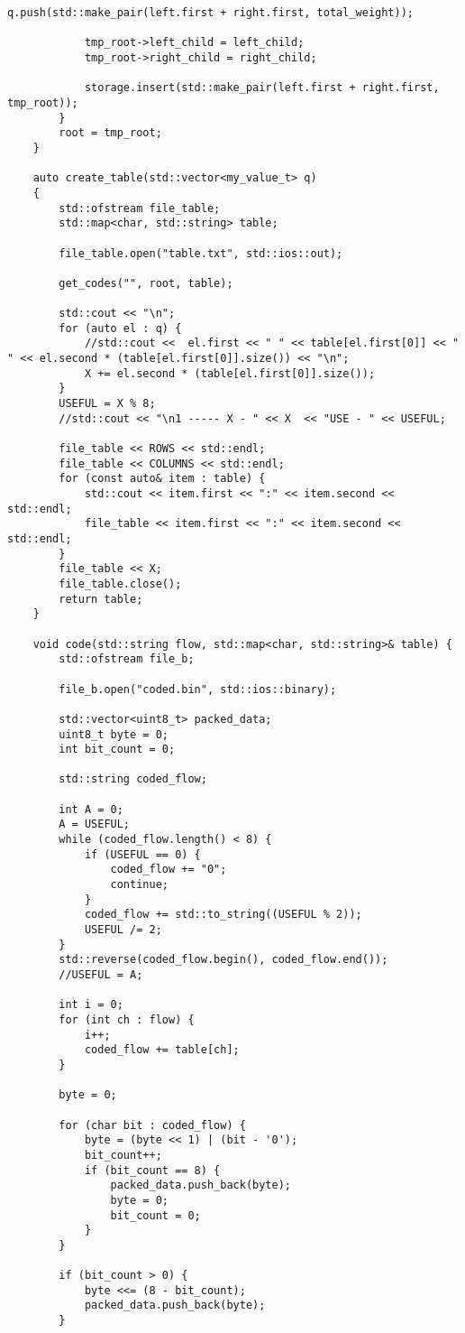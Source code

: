 \begin{lstlisting}[label = list1, caption = Программная реализация описанных алгоритмов]
			q.push(std::make_pair(left.first + right.first, total_weight));
			
			tmp_root->left_child = left_child;
			tmp_root->right_child = right_child;
			
			storage.insert(std::make_pair(left.first + right.first, tmp_root));
		}
		root = tmp_root;
	}
	
	auto create_table(std::vector<my_value_t> q)
	{
		std::ofstream file_table;
		std::map<char, std::string> table;
		
		file_table.open("table.txt", std::ios::out);
		
		get_codes("", root, table);
		
		std::cout << "\n";
		for (auto el : q) {
			//std::cout <<  el.first << " " << table[el.first[0]] << " " << el.second * (table[el.first[0]].size()) << "\n";
			X += el.second * (table[el.first[0]].size());
		}
		USEFUL = X % 8;
		//std::cout << "\n1 ----- X - " << X  << "USE - " << USEFUL;
		
		file_table << ROWS << std::endl;
		file_table << COLUMNS << std::endl;
		for (const auto& item : table) {
			std::cout << item.first << ":" << item.second << std::endl;
			file_table << item.first << ":" << item.second << std::endl;
		}
		file_table << X;
		file_table.close();
		return table;
	}
	
	void code(std::string flow, std::map<char, std::string>& table) {
		std::ofstream file_b;
		
		file_b.open("coded.bin", std::ios::binary);

		std::vector<uint8_t> packed_data;
		uint8_t byte = 0;
		int bit_count = 0;
		
		std::string coded_flow;

		int A = 0;
		A = USEFUL;
		while (coded_flow.length() < 8) {
			if (USEFUL == 0) {
				coded_flow += "0";
				continue;
			}
			coded_flow += std::to_string((USEFUL % 2));
			USEFUL /= 2;
		}
		std::reverse(coded_flow.begin(), coded_flow.end());
		//USEFUL = A;
		
		int i = 0;
		for (int ch : flow) {
			i++;
			coded_flow += table[ch];
		}

		byte = 0;
		
		for (char bit : coded_flow) {
			byte = (byte << 1) | (bit - '0');
			bit_count++;
			if (bit_count == 8) {
				packed_data.push_back(byte);
				byte = 0;
				bit_count = 0;
			}
		}
		
		if (bit_count > 0) {
			byte <<= (8 - bit_count);
			packed_data.push_back(byte);
		}
		

\end{lstlisting}
